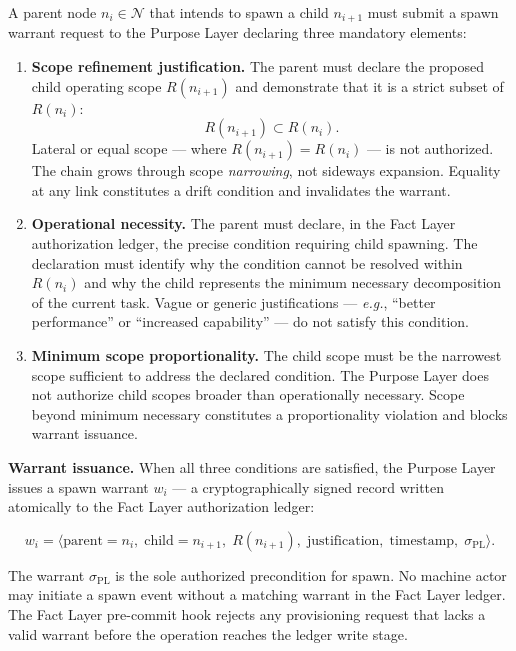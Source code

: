 A parent node $n_i \in \mathcal{N}$ that intends to spawn a child $n_{i+1}$ must submit a spawn warrant request to the Purpose Layer declaring three mandatory elements:

\begin{enumerate}
    \item[(P1)] \textbf{Scope refinement justification.} The parent must declare the proposed child operating scope $R(n_{i+1})$ and demonstrate that it is a strict subset of $R(n_i)$:
    \begin{equation}
    R(n_{i+1}) \subset R(n_i).
    \label{eq:rs-scope-refinement}
    \end{equation}
    Lateral or equal scope — where $R(n_{i+1}) = R(n_i)$ — is not authorized. The chain grows through scope \emph{narrowing}, not sideways expansion. Equality at any link constitutes a drift condition and invalidates the warrant.

    \item[(P2)] \textbf{Operational necessity.} The parent must declare, in the Fact Layer authorization ledger, the precise condition requiring child spawning. The declaration must identify why the condition cannot be resolved within $R(n_i)$ and why the child represents the minimum necessary decomposition of the current task. Vague or generic justifications — \emph{e.g.}, ``better performance'' or ``increased capability'' — do not satisfy this condition.

    \item[(P3)] \textbf{Minimum scope proportionality.} The child scope must be the narrowest scope sufficient to address the declared condition. The Purpose Layer does not authorize child scopes broader than operationally necessary. Scope beyond minimum necessary constitutes a proportionality violation and blocks warrant issuance.
\end{enumerate}

\medskip
\noindent\textbf{Warrant issuance.} When all three conditions are satisfied, the Purpose Layer issues a spawn warrant $w_i$ — a cryptographically signed record written atomically to the Fact Layer authorization ledger:

\begin{equation}
w_i = \bigl\langle
\text{parent}=n_i,\;
\text{child}=n_{i+1},\;
R(n_{i+1}),\;
\text{justification},\;
\text{timestamp},\;
\sigma_{\text{PL}}
\bigr\rangle .
\label{eq:rs-spawn-warrant}
\end{equation}

The warrant $\sigma_{\text{PL}}$ is the sole authorized precondition for spawn. No machine actor may initiate a spawn event without a matching warrant in the Fact Layer ledger. The Fact Layer pre-commit hook rejects any provisioning request that lacks a valid warrant before the operation reaches the ledger write stage.


